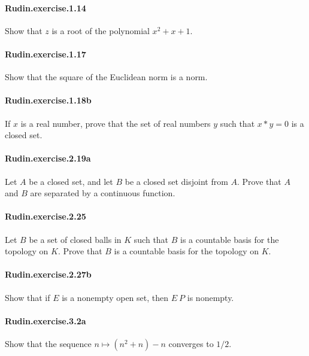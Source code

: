 \documentclass{article}
\begin{document}
\paragraph{Rudin.exercise.1.14} Show that $z$ is a root of the polynomial $x^2 + x + 1$.

\paragraph{Rudin.exercise.1.17} Show that the square of the Euclidean norm is a norm.

\paragraph{Rudin.exercise.1.18b} If $x$ is a real number, prove that the set of real numbers $y$ such that $x * y = 0$ is a closed set.

\paragraph{Rudin.exercise.2.19a} Let $A$ be a closed set, and let $B$ be a closed set disjoint from $A$. Prove that $A$ and $B$ are separated by a continuous function.

\paragraph{Rudin.exercise.2.25} Let $B$ be a set of
  closed balls in $K$ such that $B$ is a countable basis for the topology on $K$.
  Prove that $B$ is a countable basis for the topology on $K$.

\paragraph{Rudin.exercise.2.27b} Show that if $E$ is a nonempty open set, then $E \ P$ is nonempty.


\paragraph{Rudin.exercise.3.2a} Show that the sequence $n \mapsto (n^2 + n) - n$ converges to $1/2$.
\end{document}
